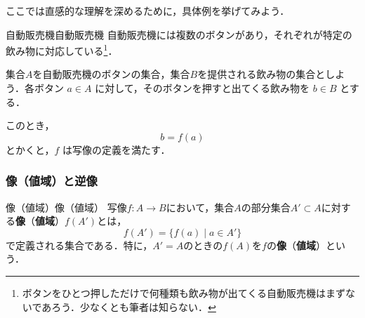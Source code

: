 \documentclass[a4paper,11pt]{ltjsarticle}
\renewcommand{\emph}[1]{\textbf{#1}}
\begin{document}
        ここでは直感的な理解を深めるために，具体例を挙げてみよう．

        \begin{example}{自動販売機}{自動販売機}
          自動販売機には複数のボタンがあり，それぞれが特定の飲み物に対応している\footnote{ボタンをひとつ押しただけで何種類も飲み物が出てくる自動販売機はまずないであろう．少なくとも筆者は知らない．}．
          
          集合$A$を自動販売機のボタンの集合，集合$B$を提供される飲み物の集合としよう．各ボタン $a \in A$ に対して，そのボタンを押すと出てくる飲み物を $b \in B$ とする．

          このとき，
          \[
          b=f(a)
          \]
          とかくと，$f$ は写像の定義を満たす．
        \end{example}


        \subsubsection{像（値域）と逆像}

        \begin{definition}{像（値域）}{像（値域）}
          写像$f \colon A \to B$において，集合$A$の部分集合$A' \subset A$に対する\emph{像}（\emph{値域}）$f(A')$とは，
          \[
          f(A') = \{ f(a) \mid a \in A' \}
          \]
          で定義される集合である．特に，$A' = A$のときの$f(A)$を$f$の\emph{像}（\emph{値域}）という．
          
           
          \end{definition}
\end{document}
